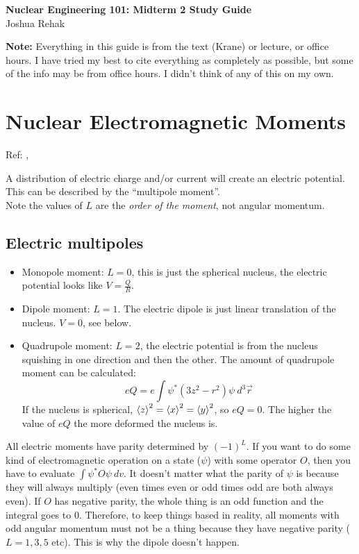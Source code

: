 \documentclass[letter]{article}
\begin{document}
\textbf{\Large{Nuclear Engineering 101: Midterm 2 Study Guide}} \\
Joshua Rehak
\vspace{12pt}

\textbf{Note:} Everything in this guide is from the text (Krane) or
lecture, or office hours. I have tried my best to cite everything as
completely as possible, but some of the info may be from office
hours. I didn't think of any of this on my own.

\section{Nuclear Electromagnetic Moments}

Ref: \cite[pp. 71-75]{krane},\cite[Lec 10]{lecture}

A distribution of electric charge and/or current will create an
electric potential. This can be described by the ``multipole
moment''. \\

Note the values of $L$ are the \textit{order of the moment}, not
angular momentum.

\subsection{Electric multipoles}

\begin{itemize}
\item Monopole moment: $L=0$, this is just the spherical nucleus, the electric
  potential looks like $V = \frac{Q}{R}$.
\item Dipole moment: $L=1$. The electric dipole is just linear
  translation of the nucleus. $V=0$, see below.
\item Quadrupole moment: $L=2$, the electric potential is from the
  nucleus squishing in one direction and then the other. The amount of
  quadrupole moment can be calculated:
  \begin{equation*}
    eQ=e\int\psi^*(3z^2-r^2)\psi~d^3\vec{r}
  \end{equation*}
  If the nucleus is spherical,
  $\braket{z}^2=\braket{x}^2=\braket{y}^2$, so $eQ=0$. The higher the
  value of $eQ$ the more deformed the nucleus is.
\end{itemize}

All electric moments have parity determined by $(-1)^L$. If you want
to do some kind of electromagnetic operation on a state ($\psi$) with
some operator $O$, then you have to evaluate $\int\psi^*O\psi~dv$. It
doesn't matter what the parity of $\psi$ is because they will always
multiply (even times even or odd times odd are both always even). If
$O$ has negative parity, the whole thing is an odd function and the
integral goes to 0. Therefore, to keep things based in reality, all
 moments with odd angular momentum must not be a thing because they
 have negative parity
($L=1,3,5$ etc). This is why the dipole doesn't happen.
\end{document}
